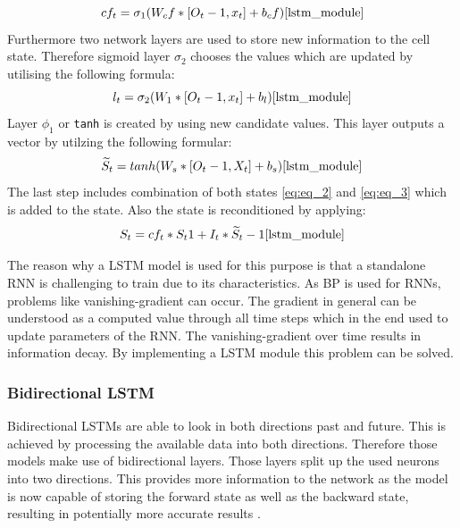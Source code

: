 \begin{equation}
cf_t = \sigma_1 (W_cf * [O_t-1, x_t] + b_cf)
\cite{lstm_module}
\label{eq:eq_1}
\end{equation}
Furthermore two network layers are used to store new information to the cell state. Therefore sigmoid layer $\sigma_2$ chooses the values which are updated by utilising the following formula:
\begin{equation}
l_t = \sigma_2(W_1 *[O_t-1, x_t]+ b_l)
\cite{lstm_module}
\label{eq:eq_2}
\end{equation}
Layer $\phi_1$ or \verb|tanh| is created by using new candidate values. This layer outputs a  vector by utilzing the following formular: 
\begin{equation}
\widetilde{S}_t = tanh(W_s * [O_t-1, X_t] + b_s)
\cite{lstm_module}
\label{eq:eq_3}
\end{equation}
The last step includes combination of both states \ref{eq:eq_2} and \ref{eq:eq_3} which is added to the state. Also the state is reconditioned by applying: \cite{lstm_module}
\begin{equation}
S_t = cf_t * S_t1 + I_t * \widetilde{S}_t-1
\cite{lstm_module}
\label{eq:eq_4}
\end{equation}

The reason why a LSTM model is used for this purpose is that a standalone RNN is challenging to train due to its characteristics. As BP is used for RNNs, problems like vanishing-gradient can occur. The gradient in general can be understood as a computed value through all time steps which in the end used to update parameters of the RNN. The vanishing-gradient over time results in information decay. By implementing a LSTM module this problem can be solved. \cite{lstm_overcome_rnn_problem}

\subsubsection{Bidirectional LSTM}
Bidirectional LSTMs are able to look in both directions past and future. This is achieved by processing the available data into both directions. Therefore those models make use of bidirectional layers. Those layers split up the used neurons into two directions. \cite{bi_di_1} This provides more information to the network as the model is now capable of storing the forward state as well as the backward state, resulting in potentially more accurate results \cite{bi_di_2}. 

